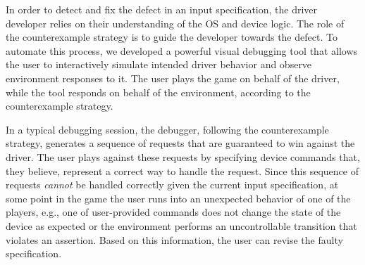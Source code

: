 
In order to detect and fix the defect in an input specification, the driver developer relies on their  understanding of the OS and device logic.  The role of the counterexample strategy is to guide the developer towards the defect.  To automate this process, we developed a powerful visual debugging tool that allows the user to interactively simulate intended driver behavior and observe environment responses to it.  The user plays the game on behalf of the driver, while the tool responds on behalf of the environment, according to the counterexample strategy.
 
In a typical debugging session, the debugger, following the counterexample strategy, generates a sequence of requests that are guaranteed to win against the driver.  The user plays against these requests by specifying device commands that, they believe, represent a correct way to handle the request.  Since this sequence of requests \emph{cannot} be handled correctly given the current input specification, at some point in the game the user runs into an unexpected behavior of one of the players, e.g., one of user-provided commands does not change the state of the device as expected or the environment performs an uncontrollable transition that violates an assertion.  Based on this information, the user can revise the faulty specification.

%       
%        


